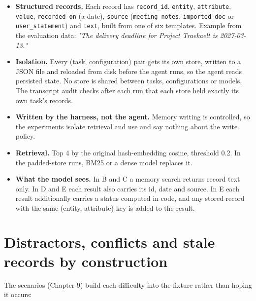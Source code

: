 \documentclass[10.5pt,a4paper,oneside]{report}
\begin{document}
\begin{itemize}
\item \textbf{Structured records.} Each record has \texttt{record\_\allowbreak{}id}, \texttt{entity}, \texttt{attribute}, \texttt{value}, \texttt{recorded\_\allowbreak{}on} (a date), \texttt{source} (\texttt{meeting\_\allowbreak{}notes}, \texttt{imported\_\allowbreak{}doc} or \texttt{user\_\allowbreak{}statement}) and \texttt{text}, built from one of six templates. Example from the evaluation data: \emph{"The delivery deadline for Project Traekaelt is 2027-03-13."}
\item \textbf{Isolation.} Every (task, configuration) pair gets its own store, written to a JSON file and reloaded from disk before the agent runs, so the agent reads persisted state. No store is shared between tasks, configurations or models. The transcript audit checks after each run that each store held exactly its own task's records.
\item \textbf{Written by the harness, not the agent.} Memory writing is controlled, so the experiments isolate retrieval and use and say nothing about the write policy.
\item \textbf{Retrieval.} Top 4 by the original hash-embedding cosine, threshold 0.2. In the padded-store runs, BM25 or a dense model replaces it.
\item \textbf{What the model sees.} In B and C a memory search returns record text only. In D and E each result also carries its id, date and source. In E each result additionally carries a status computed in code, and any stored record with the same (entity, attribute) key is added to the result.
\end{itemize}
\section{Distractors, conflicts and stale records by construction}
The scenarios (Chapter 9) build each difficulty into the fixture rather than hoping it occurs:
\end{document}
